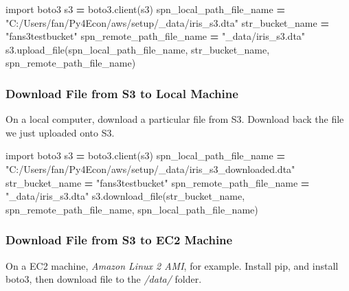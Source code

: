 \documentclass[
]{book}
\newenvironment{Shaded}{\begin{snugshade}}{\end{snugshade}}
\newcommand{\ImportTok}[1]{#1}
\newcommand{\NormalTok}[1]{#1}
\newcommand{\OperatorTok}[1]{\textcolor[rgb]{0.81,0.36,0.00}{\textbf{#1}}}
\newcommand{\StringTok}[1]{\textcolor[rgb]{0.31,0.60,0.02}{#1}}
\begin{document}
\begin{Shaded}
\begin{Highlighting}[]
\ImportTok{import}\NormalTok{ boto3}
\NormalTok{s3 }\OperatorTok{=}\NormalTok{ boto3.client(}\StringTok{\textquotesingle{}s3\textquotesingle{}}\NormalTok{)}
\NormalTok{spn\_local\_path\_file\_name }\OperatorTok{=} \StringTok{"C:/Users/fan/Py4Econ/aws/setup/\_data/iris\_s3.dta"}
\NormalTok{str\_bucket\_name }\OperatorTok{=} \StringTok{"fans3testbucket"}
\NormalTok{spn\_remote\_path\_file\_name }\OperatorTok{=} \StringTok{"\_data/iris\_s3.dta"}
\NormalTok{s3.upload\_file(spn\_local\_path\_file\_name, str\_bucket\_name, spn\_remote\_path\_file\_name)}
\end{Highlighting}
\end{Shaded}

\hypertarget{download-file-from-s3-to-local-machine}{%
\subsubsection{Download File from S3 to Local Machine}\label{download-file-from-s3-to-local-machine}}

On a local computer, download a particular file from S3. Download back the file we just uploaded onto S3.

\begin{Shaded}
\begin{Highlighting}[]
\ImportTok{import}\NormalTok{ boto3}
\NormalTok{s3 }\OperatorTok{=}\NormalTok{ boto3.client(}\StringTok{\textquotesingle{}s3\textquotesingle{}}\NormalTok{)}
\NormalTok{spn\_local\_path\_file\_name }\OperatorTok{=} \StringTok{"C:/Users/fan/Py4Econ/aws/setup/\_data/iris\_s3\_downloaded.dta"}
\NormalTok{str\_bucket\_name }\OperatorTok{=} \StringTok{"fans3testbucket"}
\NormalTok{spn\_remote\_path\_file\_name }\OperatorTok{=} \StringTok{"\_data/iris\_s3.dta"}
\NormalTok{s3.download\_file(str\_bucket\_name, spn\_remote\_path\_file\_name, spn\_local\_path\_file\_name)}
\end{Highlighting}
\end{Shaded}

\hypertarget{download-file-from-s3-to-ec2-machine}{%
\subsubsection{Download File from S3 to EC2 Machine}\label{download-file-from-s3-to-ec2-machine}}

On a EC2 machine, \emph{Amazon Linux 2 AMI}, for example. Install pip, and install boto3, then download file to the \emph{/data/} folder.
\end{document}
